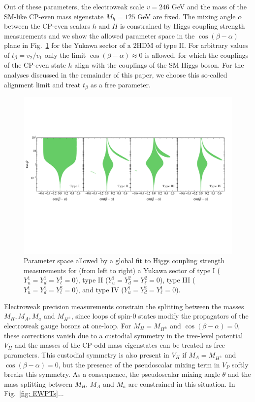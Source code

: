 Out of these parameters, the electroweak scale $v=246$ GeV and the mass of the SM-like CP-even mass eigenstate $M_h=125$ GeV are fixed. The mixing angle $\alpha$ between the CP-even scalars $h$ and $H$ is constrained by Higgs coupling strength measurements \cite{} and we show the allowed parameter space in the $\cos(\beta-\alpha)$ plane in  Fig.~\ref{fig:higgsfit} for the Yukawa sector of a 2HDM of type II.  For arbitrary values of $t_\beta=v_2/v_1$ only the limit $\cos(\beta-\alpha)\approx 0$ is allowed, for which the couplings of the CP-even state $h$ align with the couplings of the SM Higgs boson. For the analyses discussed in the remainder of this paper, we choose this so-called alignment limit and treat $t_\beta$ as a free parameter.
\begin{figure}[t]
\includegraphics[width=\textwidth]{texinputs/03_theoparameters/Figs/Higgsfit}
\caption{\label{fig:higgsfit} Parameter space allowed by a global fit to Higgs coupling strength measurements for (from left to right) a Yukawa sector of type I ($Y_u^1  = Y_d^1 = Y_\ell^1 =0$), type II ($Y_u^1 = Y_d^2 = Y_\ell^2 =0$),  type III ($Y_u^1 = Y_d^1 = Y_\ell^2 =0$), and type IV ($Y_u^1  = Y_d^2 = Y_\ell^1 =0$). }
\end{figure}
Electroweak precision measurements constrain the splitting between the masses $M_H, M_A, M_a$ and $M_{H^\pm}$, since loops of spin-0 states modify the propagators of the electroweak gauge bosons at one-loop. For $M_H=M_{H^\pm}$ and $\cos(\beta-\alpha)=0$, these corrections vanish due to a custodial symmetry in the tree-level potential $V_H$ \cite{} and the masses of the CP-odd mass eigenstates can be treated as free parameters. This custodial symmetry is also present in $V_H$ if $M_A=M_{H^\pm}$ and $\cos(\beta-\alpha)=0$, but the presence of the pseudoscalar mixing term in $V_P$ softly breaks this symmetry. As a consequence, the pseudoscalar mixing angle $\theta$ and the mass splitting between $M_H$, $M_A$ and $M_a$ are constrained in this situation. In Fig.~\ref{fig: EWPTs}...
